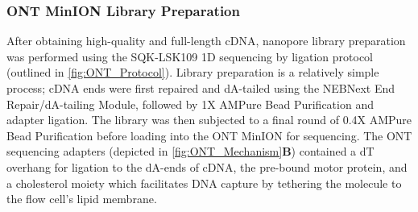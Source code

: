 \subsubsection{ONT MinION Library Preparation}
\label{sec: ONTlib_preparation}
After obtaining high-quality and full-length cDNA, nanopore library preparation was performed using the SQK-LSK109 1D sequencing by ligation protocol (outlined in \cref{fig:ONT_Protocol}). Library preparation is a relatively simple process; cDNA ends were first repaired and dA-tailed using the NEBNext End Repair/dA-tailing Module, followed by 1X AMPure Bead Purification and adapter ligation. The library was then subjected to a final round of 0.4X AMPure Bead Purification before loading into the ONT MinION for sequencing. The ONT sequencing adapters (depicted in \cref{fig:ONT_Mechanism}\textbf{B}) contained a dT overhang for ligation to the dA-ends of cDNA, the pre-bound motor protein, and a cholesterol moiety which facilitates DNA capture by tethering the molecule to the flow cell's lipid membrane.

